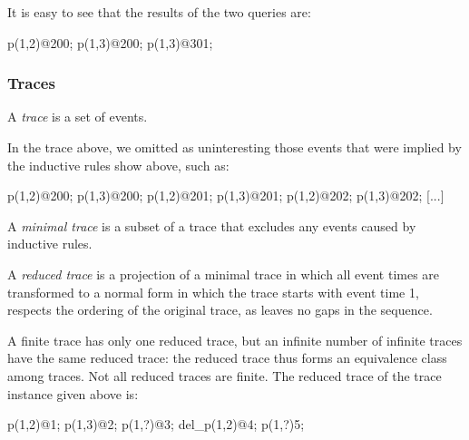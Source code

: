 It is easy to see that the results of the two queries are:


\begin{Dedalus}
p(1,2)@200;
p(1,3)@200;
p(1,3)@301;
\end{Dedalus}

\subsubsection{Traces}

\begin{definition}
A \emph{trace} is a set of events.
\end{definition}

In the trace above, we omitted as uninteresting those events that were implied by the 
inductive rules show above, such as:

\begin{Dedalus}
p(1,2)@200;
p(1,3)@200;
p(1,2)@201;
p(1,3)@201;
p(1,2)@202;
p(1,3)@202;
[...]
\end{Dedalus}



\begin{definition}
A \emph{minimal trace} is a subset of a trace that excludes any events caused by inductive rules.
\end{definition}

\begin{definition}
A \emph{reduced trace} is a projection of a minimal trace in which all event times are transformed
to a normal form in which the trace starts with event time 1, respects the ordering of the original trace, as leaves no gaps in the sequence.
\end{definition}

A finite trace has only one reduced trace, but an infinite number of infinite traces have the same reduced trace: the reduced trace thus forms an 
equivalence class among traces.  Not all reduced traces are finite.  The reduced trace of the trace instance given above is:

\begin{Dedalus}
p(1,2)@1;
p(1,3)@2;
p(1,?)@3;
del_p(1,2)@4;
p(1,?)5;
\end{Dedalus}



